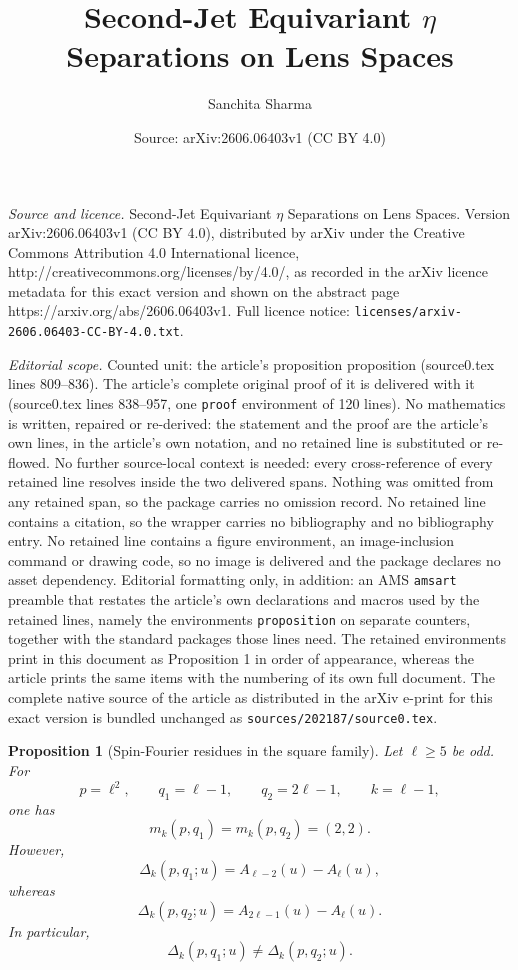 \documentclass[10pt,a4paper]{amsart}
\title{Second-Jet Equivariant $\eta$ Separations on Lens Spaces}
\author{Sanchita Sharma}
\date{Source: arXiv:2606.06403v1 (CC BY 4.0)}
\newtheorem{proposition}{Proposition}
\begin{document}
\maketitle

\noindent\emph{Source and licence.} Second-Jet Equivariant $\eta$ Separations on Lens Spaces. Version arXiv:2606.06403v1 (CC BY 4.0), distributed by arXiv under the Creative Commons Attribution 4.0 International licence, http://creativecommons.org/licenses/by/4.0/, as recorded in the arXiv licence metadata for this exact version and shown on the abstract page https://arxiv.org/abs/2606.06403v1. Full licence notice: \texttt{licenses/arxiv-2606.06403-CC-BY-4.0.txt}.\par\smallskip

\noindent\textit{Editorial scope.} Counted unit: the article's proposition proposition (source0.tex lines 809--836). The article's complete original proof of it is delivered with it (source0.tex lines 838--957, one \texttt{proof} environment of 120 lines). No mathematics is written, repaired or re-derived: the statement and the proof are the article's own lines, in the article's own notation, and no retained line is substituted or re-flowed.  No further source-local context is needed: every cross-reference of every retained line resolves inside the two delivered spans.  Nothing was omitted from any retained span, so the package carries no omission record.  No retained line contains a citation, so the wrapper carries no bibliography and no bibliography entry.  No retained line contains a figure environment, an image-inclusion command or drawing code, so no image is delivered and the package declares no asset dependency.  Editorial formatting only, in addition: an AMS \texttt{amsart} preamble that restates the article's own declarations and macros used by the retained lines, namely the environments \texttt{proposition} on separate counters, together with the standard packages those lines need.  The retained environments print in this document as Proposition 1 in order of appearance, whereas the article prints the same items with the numbering of its own full document.  The complete native source of the article as distributed in the arXiv e-print for this exact version is bundled unchanged as \texttt{sources/202187/source0.tex}.
\begin{proposition}[Spin-Fourier residues in the square family]
Let $\ell\geq 5$ be odd.  For
\begin{equation}
p=\ell^2,
\qquad
q_1=\ell-1,
\qquad
q_2=2\ell-1,
\qquad
k=\ell-1,
\end{equation}
one has
\begin{equation}
m_k(p,q_1)=m_k(p,q_2)=(2,2).
\end{equation}
However,
\begin{equation}
\Delta_k(p,q_1;u)=A_{\ell-2}(u)-A_{\ell}(u),
\end{equation}
whereas
\begin{equation}
\Delta_k(p,q_2;u)=A_{2\ell-1}(u)-A_{\ell}(u).
\end{equation}
In particular,
\begin{equation}
\Delta_k(p,q_1;u)\neq \Delta_k(p,q_2;u).
\end{equation}
\end{proposition}
\end{document}
